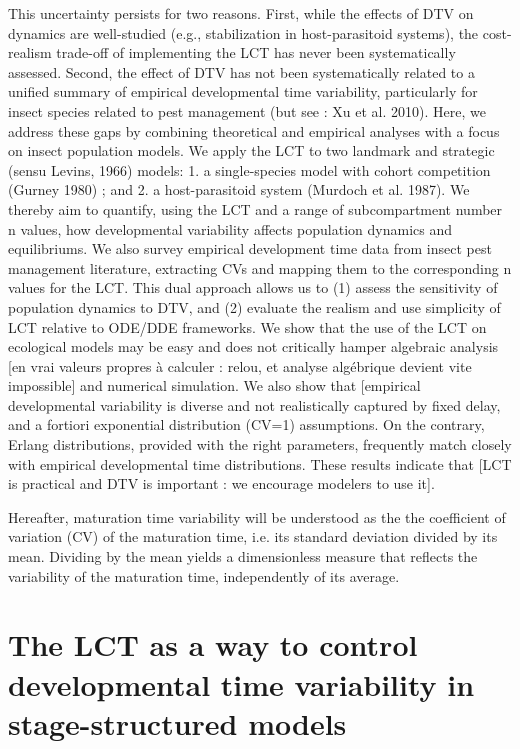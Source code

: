 \documentclass[12pt,a4paper,onecolumn]{article}
\begin{document}
\tabto{1 cm}  This uncertainty persists for two reasons. First, while the effects of DTV on dynamics are well-studied (e.g., stabilization in host-parasitoid systems), the cost-realism trade-off of implementing the LCT has never been systematically assessed. Second, the effect of DTV has not been systematically related to a unified summary of empirical developmental time variability, particularly for insect species related to pest management (but see : Xu et al. 2010). Here, we address these gaps by combining theoretical and empirical analyses with a focus on insect population models. We apply the LCT to two landmark and strategic (sensu Levins, 1966) models: 1. a single-species model with cohort competition (Gurney 1980) ; and 2. a host-parasitoid system (Murdoch et al. 1987). We thereby aim to quantify, using the LCT and a range of subcompartment number n values, how developmental variability affects population dynamics and equilibriums. We also survey empirical development time data from insect pest management literature, extracting CVs and mapping them to the corresponding n values for the LCT. This dual approach allows us to (1) assess the sensitivity of population dynamics to DTV, and (2) evaluate the realism and use simplicity of LCT relative to ODE/DDE frameworks. We show that the use of the LCT on ecological models may be easy and does not critically hamper algebraic analysis [en vrai valeurs propres à calculer : relou, et analyse algébrique devient vite impossible] and numerical simulation. We also show that [empirical developmental variability is diverse and not realistically captured by fixed delay, and a fortiori exponential distribution (CV=1) assumptions. On the contrary, Erlang distributions, provided with the right parameters, frequently match closely with empirical developmental time distributions. These results indicate that [LCT is practical and DTV is important : we encourage modelers to use it]. 


Hereafter, maturation time variability will be understood as the the coefficient of variation (CV) of the maturation time, i.e. its standard deviation divided by its mean. Dividing by the mean yields a dimensionless measure that reflects the variability of the maturation time, independently of its average.


\section{The LCT as a way to control developmental time variability in stage-structured models}
\end{document}
